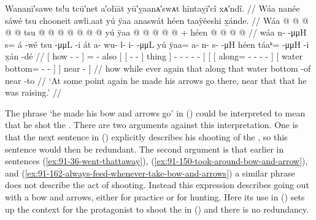 \ex\label{ex:91-181-made-arrows-go-near}%
%
\begingl
	\glpreamble	Wananī′sawe ts!u tcū′net a′ołīāt yū′ỵaanᴀ′swᴀt hīntaỵī′cî xᴀ′ndî. //
	\glpreamble	Wáa nanée sáwé tsu chooneit awli.aat yú ÿaa anaswát héen taaÿéeshi x̱ánde. //
	\gla	{} Wáa  @ {} @ {} @ {} {}
		 @ {} @ {} tsu
		{} {}  @ {} @ {} {} {} {}
		 @ {} @ {} @ {} @ {} @ {}
		{} {} yú {} ÿaa @  @ {} @ {} @ {} @ {} {} {} +
			{} héen  @ {} @ {} @ {} {} {}
			 @ {} {} //
	\glb	{} wáa n-  -μμH {} {} 
		s= á -wé tsu
		{} {}  -μμL -i {} át {}
		a- wu- l- i-  -μμL
		{} {} yú {} ÿaa= a- n- s-  -μH {} {}
			{} héen táaᵏ=  -μμH -i {} {}
			x̱án -dé {} //
	\glc	{}[ how -  - \· {}]
		=  - also
		{}[ {}[  - - {}] thing {}]
		- - - -  -
		{}[ {}[ 
				{}[ along= - - -
					 - \· {}]
			{}[ water bottom=  - - {}] {}]
			near - {}] //
	\gld	{} how  {} {} \·while {}
		ever\•  {} again
		{} {}  {} {} {} {} {}
		 {} {} {} {} {}
		{} {} that {} along  {} {} {} {} 
					\·that {}
			{} water bottom  {} -of {} {}
			near -to {} //
	\glft	‘At some point again he made his arrows go there, near that  that he was raising.’
		//
\endgl
\xe

The phrase  ‘he made his bow and arrows go’ in (\lastx) could be interpreted to mean that he shot the .
There are two arguments against this interpretation.
One is that the next sentence in (\nextx) explicitly describes his shooting of the , so this sentence would then be redundant.
The second argument is that earlier in sentences (\ref{ex:91-36-went-thattaway}), (\ref{ex:91-150-took-around-bow-and-arrow}), and (\ref{ex:91-162-always-feed-whenever-take-bow-and-arrows}) a similar phrase does not describe the act of shooting.
Instead this expression describes going out with a bow and arrows, either for practice or for hunting.
Here its use in (\lastx) sets up the context for the protagonist to shoot the  in (\nextx) and there is no redundancy.

